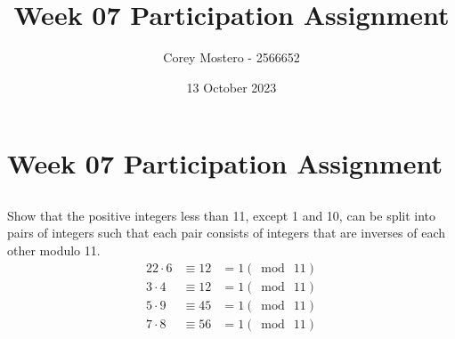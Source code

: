 \documentclass{article}
\title{Week 07 Participation Assignment}
\author{Corey Mostero - 2566652}
\date{13 October 2023}
\begin{document}
\newcommand{\hr}{\par\noindent\rule{\textwidth}{0.4pt}}

\newcommand{\bc}[1]{
	\begin{equation*}
		\begin{boxed}
			{#1}
		\end{boxed}
	\end{equation*}
}

\newcommand{\cond}[2]{
	\ifmmode
	{#1} \quad {#2}
	\else
	$$ {#1} \quad {#2} $$
	\fi
}

\newcommand{\matr}[1]{
	\ifmmode \bm{#1}
	\else \textit{\textbf{#1}}
	\fi
}
\newcommand{\vect}[1]{
	\ifmmode \mathbf{#1}
	\else \textbf{#1}
	\fi
}


\maketitle
\newpage

\tableofcontents

\section{Week 07 Participation Assignment}

\subsection{} \label{a}

Show that the positive integers less than 11, except 1 and 10, can be split into pairs of integers such that each pair consists of integers that are inverses of each other modulo 11.
\begin{alignat*}{2}
	2 \cdot 6 & \equiv 12 & = 1(\bmod \ 11) \\
	3 \cdot 4 & \equiv 12 & = 1(\bmod \ 11) \\
	5 \cdot 9 & \equiv 45 & = 1(\bmod \ 11) \\
	7 \cdot 8 & \equiv 56 & = 1(\bmod \ 11)
\end{alignat*}

\subsection{} \label{b}
\end{document}
